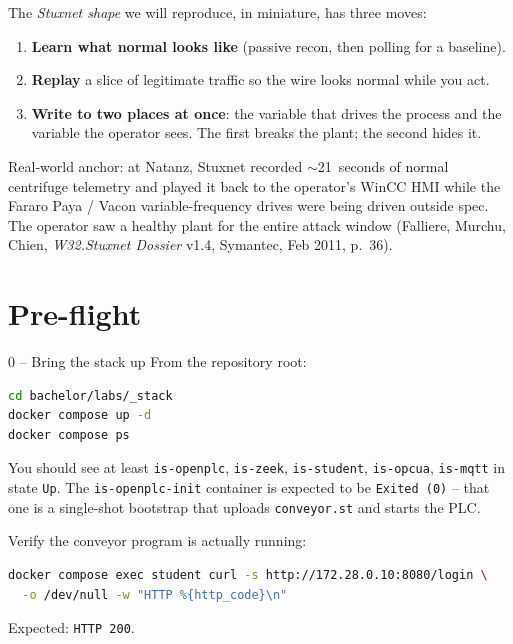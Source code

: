 \documentclass[11pt,a4paper]{article}
\begin{document}
The \emph{Stuxnet shape} we will reproduce, in miniature, has three
moves:
\begin{enumerate}\setlength{\itemsep}{1pt}
  \item \textbf{Learn what normal looks like} (passive recon, then
        polling for a baseline).
  \item \textbf{Replay} a slice of legitimate traffic so the wire
        looks normal while you act.
  \item \textbf{Write to two places at once}: the variable that drives
        the process and the variable the operator sees. The first
        breaks the plant; the second hides it.
\end{enumerate}

Real-world anchor: at Natanz, Stuxnet recorded $\sim$21~seconds of
normal centrifuge telemetry and played it back to the operator's
WinCC HMI while the Fararo Paya / Vacon variable-frequency drives
were being driven outside spec. The operator saw a healthy plant
for the entire attack window (Falliere, Murchu, Chien,
\emph{W32.Stuxnet Dossier} v1.4, Symantec, Feb 2011, p.~36).

\section*{Pre-flight}

\begin{stepbox}{0 -- Bring the stack up}
From the repository root:
\begin{lstlisting}[language=bash]
cd bachelor/labs/_stack
docker compose up -d
docker compose ps
\end{lstlisting}
You should see at least \texttt{is-openplc}, \texttt{is-zeek},
\texttt{is-student}, \texttt{is-opcua}, \texttt{is-mqtt} in
state \texttt{Up}. The \texttt{is-openplc-init} container is
expected to be \texttt{Exited (0)} -- that one is a single-shot
bootstrap that uploads \texttt{conveyor.st} and starts the PLC.

Verify the conveyor program is actually running:
\begin{lstlisting}[language=bash]
docker compose exec student curl -s http://172.28.0.10:8080/login \
  -o /dev/null -w "HTTP %{http_code}\n"
\end{lstlisting}
Expected: \texttt{HTTP 200}.
\end{stepbox}

\end{document}
